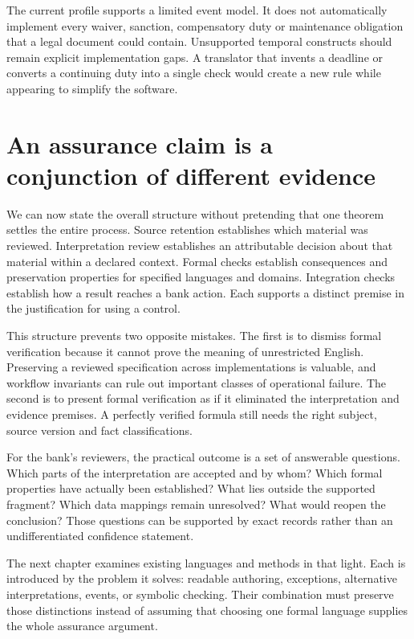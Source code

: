 \documentclass[12pt,a4paper,oneside,openany]{book}
\begin{document}
The current profile supports a limited event model. It does not automatically
implement every waiver, sanction, compensatory duty or maintenance obligation
that a legal document could contain. Unsupported temporal constructs should
remain explicit implementation gaps. A translator that invents a deadline or
converts a continuing duty into a single check would create a new rule while
appearing to simplify the software.

\section{An assurance claim is a conjunction of different evidence}
\label{merge:M03:12}

\label{sec:proof-assurance}
We can now state the overall structure without pretending that one theorem
settles the entire process. Source retention establishes which material was
reviewed. Interpretation review establishes an attributable decision about that
material within a declared context. Formal checks establish consequences and
preservation properties for specified languages and domains. Integration checks
establish how a result reaches a bank action. Each supports a distinct premise
in the justification for using a control.

This structure prevents two opposite mistakes. The first is to dismiss formal
verification because it cannot prove the meaning of unrestricted English.
Preserving a reviewed specification across implementations is valuable, and
workflow invariants can rule out important classes of operational failure. The
second is to present formal verification as if it eliminated the interpretation
and evidence premises. A perfectly verified formula still needs the right
subject, source version and fact classifications.

For the bank's reviewers, the practical outcome is a set of answerable
questions. Which parts of the interpretation are accepted and by whom? Which
formal properties have actually been established? What lies outside the
supported fragment? Which data mappings remain unresolved? What would reopen
the conclusion? Those questions can be supported by exact records rather than
an undifferentiated confidence statement.

The next chapter examines existing languages and methods in that light. Each
is introduced by the problem it solves: readable authoring, exceptions,
alternative interpretations, events, or symbolic checking. Their combination
must preserve those distinctions instead of assuming that choosing one formal
language supplies the whole assurance argument.
\end{document}
